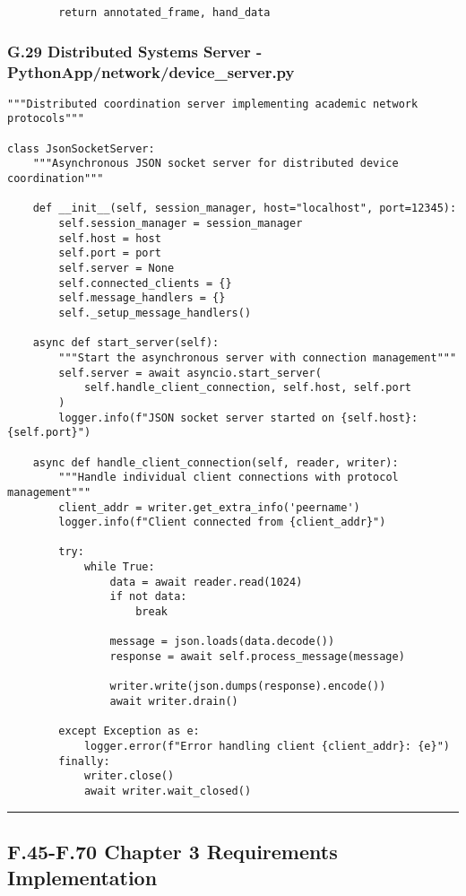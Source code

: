 \documentclass[11pt,a4paper]{article}
\begin{document}
{{\begin{verbatim}
        return annotated_frame, hand_data
\end{verbatim}

\subsubsection{G.29 Distributed Systems Server - PythonApp/network/device_server.py}

\begin{verbatim}
"""Distributed coordination server implementing academic network protocols"""

class JsonSocketServer:
    """Asynchronous JSON socket server for distributed device coordination"""

    def __init__(self, session_manager, host="localhost", port=12345):
        self.session_manager = session_manager
        self.host = host
        self.port = port
        self.server = None
        self.connected_clients = {}
        self.message_handlers = {}
        self._setup_message_handlers()

    async def start_server(self):
        """Start the asynchronous server with connection management"""
        self.server = await asyncio.start_server(
            self.handle_client_connection, self.host, self.port
        )
        logger.info(f"JSON socket server started on {self.host}:{self.port}")

    async def handle_client_connection(self, reader, writer):
        """Handle individual client connections with protocol management"""
        client_addr = writer.get_extra_info('peername')
        logger.info(f"Client connected from {client_addr}")

        try:
            while True:
                data = await reader.read(1024)
                if not data:
                    break

                message = json.loads(data.decode())
                response = await self.process_message(message)

                writer.write(json.dumps(response).encode())
                await writer.drain()

        except Exception as e:
            logger.error(f"Error handling client {client_addr}: {e}")
        finally:
            writer.close()
            await writer.wait_closed()
\end{verbatim}

\hrule

\subsection{F.45-F.70 Chapter 3 Requirements Implementation}

}}
\end{document}
